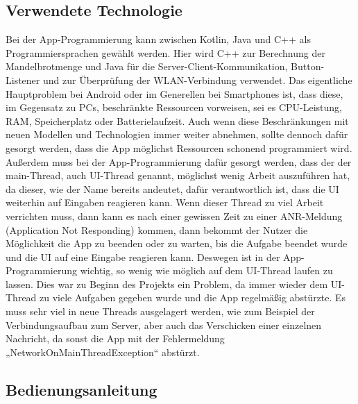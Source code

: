 \documentclass[12pt, onecolumn, notitlepage]{scrartcl}
\begin{document}
\subsection{Verwendete Technologie}
Bei der App-Programmierung kann zwischen Kotlin, Java und C++ als Programmiersprachen gewählt werden. Hier wird C++ zur Berechnung der Mandelbrotmenge und Java für die Server-Client-Kommunikation, Button-Listener und zur Überprüfung der WLAN-Verbindung verwendet. Das eigentliche Hauptproblem bei Android oder im Generellen bei Smartphones ist, dass diese, im Gegensatz zu PCs, beschränkte Ressourcen vorweisen, sei es CPU-Leistung, RAM, Speicherplatz oder Batterielaufzeit. Auch wenn diese Beschränkungen mit neuen Modellen und Technologien immer weiter abnehmen, sollte dennoch dafür gesorgt werden, dass die App möglichst Ressourcen schonend programmiert wird. Außerdem muss bei der App-Programmierung dafür gesorgt werden, dass der der main-Thread, auch UI-Thread genannt, möglichst wenig Arbeit auszuführen hat, da dieser, wie der Name bereits andeutet, dafür verantwortlich ist, dass die UI weiterhin auf Eingaben reagieren kann. Wenn dieser Thread zu viel Arbeit verrichten muss, dann kann es nach einer gewissen Zeit zu einer ANR-Meldung (Application Not Responding) kommen, dann bekommt der Nutzer die Möglichkeit die App zu beenden oder zu warten, bis die Aufgabe beendet wurde und die UI auf eine Eingabe reagieren kann. Deswegen ist in der App-Programmierung wichtig, so wenig wie möglich auf dem UI-Thread laufen zu lassen. Dies war zu Beginn des Projekts ein Problem, da immer wieder dem UI-Thread zu viele Aufgaben gegeben wurde und die App regelmäßig abstürzte. Es muss sehr viel in neue Threads ausgelagert werden, wie zum Beispiel der Verbindungsaufbau zum Server, aber auch das Verschicken einer einzelnen Nachricht, da sonst die App mit der Fehlermeldung „NetworkOnMainThreadException“ abstürzt.
\subsection{Bedienungsanleitung}
\end{document}
